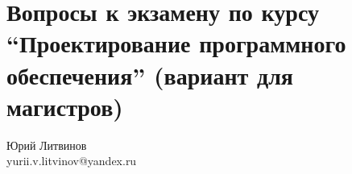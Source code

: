 \documentclass[a5paper]{article}
\begin{document}
\thispagestyle{empty}

\section*{Вопросы к экзамену по курсу \enquote{Проектирование программного обеспечения} (вариант для магистров)}

\begin{flushright}\begin{small}Юрий Литвинов\\\small{yurii.v.litvinov@yandex.ru}\end{small}\end{flushright}
\end{document}
